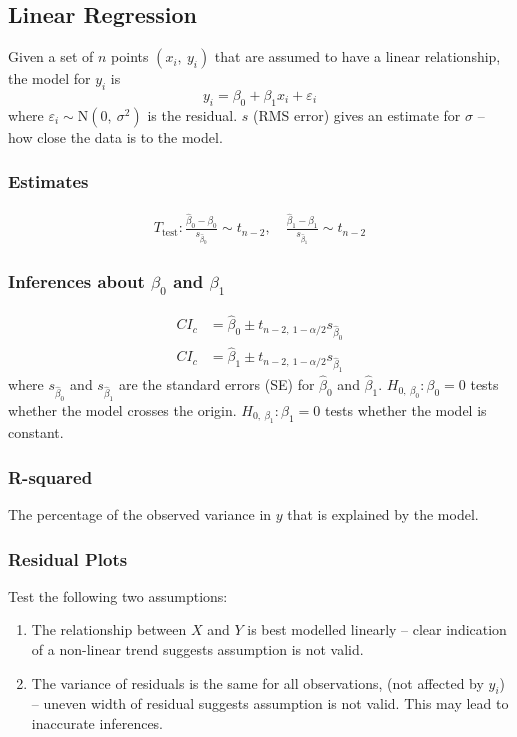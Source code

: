 \documentclass{article}
\begin{document}
\begin{multicols}{3}
    \subsection*{Linear Regression}
    Given a set of $n$ points $\left( x_i,\: y_i \right)$ that are assumed to have a linear relationship,
    the model for $y_i$ is
    \begin{equation*}
        y_i = \beta_0 + \beta_1 x_i + \varepsilon_i
    \end{equation*}
    where $\varepsilon_i \sim \mathrm{N}\left( 0,\: \sigma^2 \right)$ is the residual.
    $s$ (RMS error) gives an estimate for $\sigma$ --
    how close the data is to the model.
    \subsubsection*{Estimates}
    \begin{align*}
        T_{\text{test}}:\frac{\hat{\beta}_0 - \beta_0}{s_{\hat{\beta}_0}} \sim t_{n-2},\quad \frac{\hat{\beta}_1 - \beta_1}{s_{\hat{\beta}_1}} \sim t_{n-2}
    \end{align*}
    \subsubsection*{Inferences about $\beta_0$ and $\beta_1$}
    \begin{align*}
        CI_c & = \hat{\beta}_0 \pm t_{n-2,\: 1-\alpha/2} s_{\hat{\beta}_0} \\
        CI_c & = \hat{\beta}_1 \pm t_{n-2,\: 1-\alpha/2} s_{\hat{\beta}_1}
    \end{align*}
    where $s_{\hat{\beta}_0}$ and $s_{\hat{\beta}_1}$ are the standard errors (SE) for $\hat{\beta}_0$ and $\hat{\beta}_1$.
    $H_{0,\:\beta_0}:\beta_0=0$ tests whether the model crosses the origin.
    $H_{0,\:\beta_1}:\beta_1=0$ tests whether the model is constant.
    \subsubsection*{R-squared}
    The percentage of the observed variance in $y$ that is explained by the model.
    \subsubsection*{Residual Plots}
    Test the following two assumptions:
    \begin{enumerate}
        \item The relationship between $X$ and $Y$ is best modelled linearly
              -- clear indication of a non-linear trend suggests assumption is not valid.
        \item The variance of residuals is the same for all observations, (not affected by $y_i$)
              -- uneven width of residual suggests assumption is not valid.
              This may lead to inaccurate inferences.
    \end{enumerate}
\end{multicols}
\end{document}
